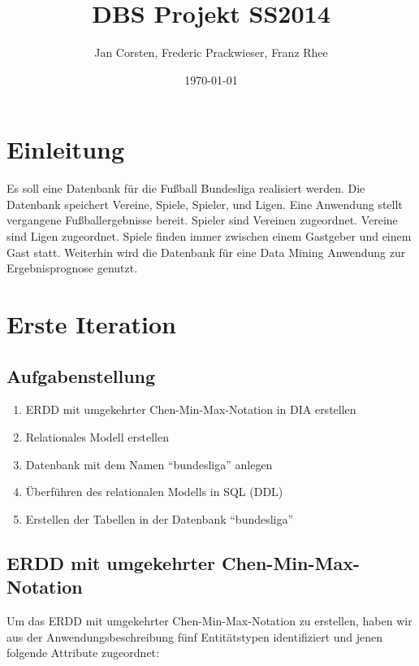 \documentclass[
10pt,
a4paper
]{scrartcl}
\title{DBS Projekt SS2014}
\author{Jan Corsten, Frederic Prackwieser, Franz Rhee}
\date{\today}
\begin{document}
\maketitle
\tableofcontents

\section*{Einleitung}

Es soll eine Datenbank f\"{u}r die Fußball Bundesliga realisiert werden. Die Datenbank speichert Vereine, Spiele, Spieler, und Ligen. Eine Anwendung stellt vergangene Fußballergebnisse bereit. Spieler sind Vereinen zugeordnet. Vereine sind Ligen zugeordnet. Spiele finden immer zwischen einem Gastgeber und einem Gast statt.
Weiterhin wird die Datenbank für eine Data Mining Anwendung zur Ergebnisprognose genutzt.

\section{Erste Iteration}

\subsection{Aufgabenstellung}

\begin{enumerate}
  \item ERDD mit umgekehrter Chen-Min-Max-Notation in DIA erstellen
  \item Relationales Modell erstellen
  \item Datenbank mit dem Namen “bundesliga” anlegen
  \item Überführen des relationalen Modells in SQL (DDL)
  \item Erstellen der Tabellen in der Datenbank “bundesliga”
\end{enumerate}

\subsection{ERDD mit umgekehrter Chen-Min-Max-Notation}

Um das ERDD mit umgekehrter Chen-Min-Max-Notation zu erstellen, haben wir aus der Anwendungsbeschreibung fünf Entitätstypen identifiziert und jenen folgende Attribute  zugeordnet:
\end{document}
